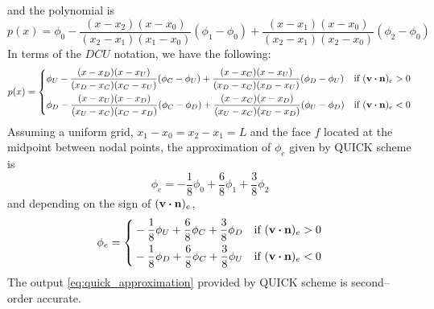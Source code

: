 and the polynomial is
\begin{equation*}
	p(x) = 
	\phi_0 - 
	\frac{(x - x_2) (x - x_0)}{(x_2 - x_1)(x_1 - x_0)} (\phi_1 - \phi_0) + 
	\frac{(x - x_1)(x - x_0)}{(x_2 - x_1)(x_2 - x_0)} (\phi_2 - \phi_0)
\end{equation*}
In terms of the $DCU$ notation, we have the following:
\begin{equation*}
	p(x) = 
	\left\{
	\begin{aligned}		
		&\phi_U - 
		\frac{(x - x_D)(x - x_U)}{(x_D - x_C)(x_C - x_U)} (\phi_C - \phi_U) + 
		\frac{(x - x_C)(x - x_U)}{(x_D - x_C)(x_D - x_U)} (\phi_D - \phi_U)
		& &\text{if } (\vb{v} \vdot \vb{n})_e > 0 \\
		&\phi_D - 
		\frac{(x - x_U)(x - x_D)}{(x_U - x_C)(x_C - x_D)} (\phi_C - \phi_D) + 
		\frac{(x - x_C)(x - x_D)}{(x_U - x_C)(x_U - x_D)} (\phi_U - \phi_D)
		& &\text{if } (\vb{v} \vdot \vb{n})_e < 0
	\end{aligned}
	\right.
\end{equation*}
Assuming a uniform grid, \ie $x_1 - x_0 = x_2 - x_1 = L$ and the face $f$
located at the midpoint between nodal points, the approximation of $\phi_e$
given by QUICK scheme is
\begin{equation*}
	\phi_e = -\frac{1}{8} \phi_0 + \frac{6}{8} \phi_1 + \frac{3}{8} \phi_2
\end{equation*}
and depending on the sign of $(\vb{v} \vdot \vb{n})_e$,
\begin{equation} \label{eq:quick_approximation}
	\phi_e = 
	\left\{
	\begin{aligned}
		&-\frac{1}{8} \phi_U + \frac{6}{8} \phi_C + \frac{3}{8} \phi_D & 
		&\text{if } (\vb{v} \vdot \vb{n})_e > 0 \\
		&-\frac{1}{8} \phi_D + \frac{6}{8} \phi_C + \frac{3}{8} \phi_U & 
		&\text{if } (\vb{v} \vdot \vb{n})_e < 0 \\
	\end{aligned}
	\right.
\end{equation}
The output \eqref{eq:quick_approximation} provided by QUICK scheme is
second--order accurate.